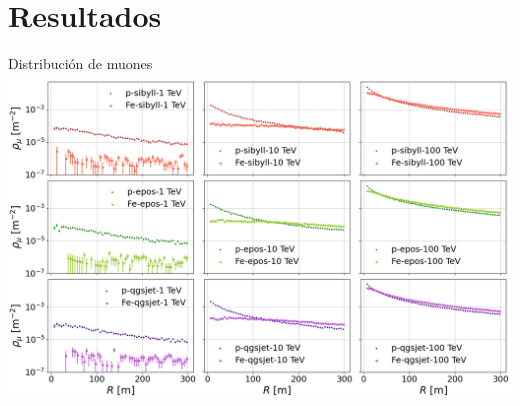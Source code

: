 \documentclass[10pt,xcolor=table]{beamer}
\begin{document}
\section{Resultados}
\begin{frame}{Distribuci\'on de muones}
\includegraphics[width=\textwidth]{Figuras/lateraldist.png}
\end{frame}
\end{document}
